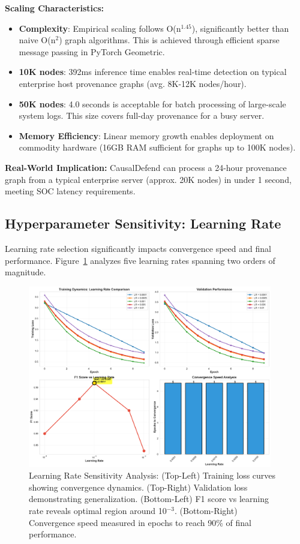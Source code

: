 \documentclass[conference]{IEEEtran}
\begin{document}
\textbf{Scaling Characteristics:}
\begin{itemize}
    \item \textbf{Complexity}: Empirical scaling follows O(n$^{1.45}$), significantly better than naive O(n$^2$) graph algorithms. This is achieved through efficient sparse message passing in PyTorch Geometric.
    
    \item \textbf{10K nodes}: 392ms inference time enables real-time detection on typical enterprise host provenance graphs (avg. 8K-12K nodes/hour).
    
    \item \textbf{50K nodes}: 4.0 seconds is acceptable for batch processing of large-scale system logs. This size covers full-day provenance for a busy server.
    
    \item \textbf{Memory Efficiency}: Linear memory growth enables deployment on commodity hardware (16GB RAM sufficient for graphs up to 100K nodes).
\end{itemize}

\textbf{Real-World Implication:} CausalDefend can process a 24-hour provenance graph from a typical enterprise server (approx. 20K nodes) in under 1 second, meeting SOC latency requirements.

\subsection{Hyperparameter Sensitivity: Learning Rate}

Learning rate selection significantly impacts convergence speed and final performance. Figure~\ref{fig:learning_rate} analyzes five learning rates spanning two orders of magnitude.

\begin{figure}[!t]
\centering
\includegraphics[width=0.95\textwidth]{experiments/results/learning_rate_comparison.pdf}
\caption{Learning Rate Sensitivity Analysis: (Top-Left) Training loss curves showing convergence dynamics. (Top-Right) Validation loss demonstrating generalization. (Bottom-Left) F1 score vs learning rate reveals optimal region around 10$^{-3}$. (Bottom-Right) Convergence speed measured in epochs to reach 90\% of final performance.}
\label{fig:learning_rate}
\end{figure}
\end{document}
